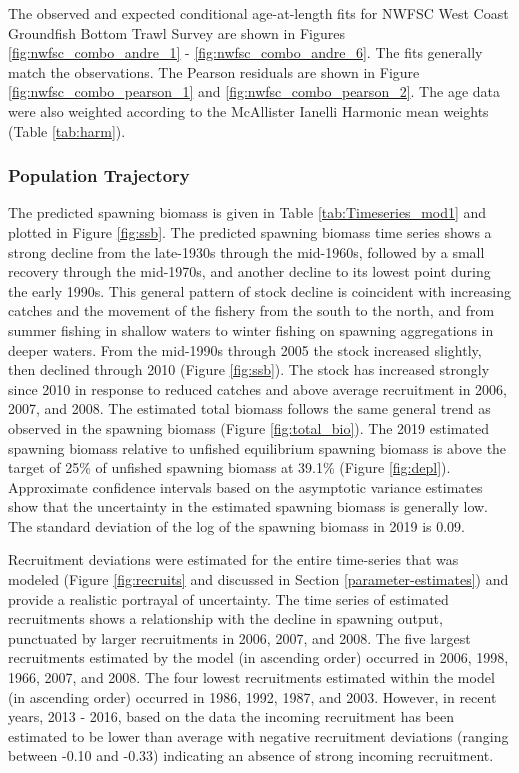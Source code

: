 \documentclass[12pt,]{article}
\begin{document}
The observed and expected conditional age-at-length fits for NWFSC West
Coast Groundfish Bottom Trawl Survey are shown in Figures
\ref{fig:nwfsc_combo_andre_1} - \ref{fig:nwfsc_combo_andre_6}. The fits
generally match the observations. The Pearson residuals are shown in
Figure \ref{fig:nwfsc_combo_pearson_1} and
\ref{fig:nwfsc_combo_pearson_2}. The age data were also weighted
according to the McAllister Ianelli Harmonic mean weights (Table
\ref{tab:harm}).

\subsubsection{Population Trajectory}\label{population-trajectory}

The predicted spawning biomass is given in Table
\ref{tab:Timeseries_mod1} and plotted in Figure \ref{fig:ssb}. The
predicted spawning biomass time series shows a strong decline from the
late-1930s through the mid-1960s, followed by a small recovery through
the mid-1970s, and another decline to its lowest point during the early
1990s. This general pattern of stock decline is coincident with
increasing catches and the movement of the fishery from the south to the
north, and from summer fishing in shallow waters to winter fishing on
spawning aggregations in deeper waters. From the mid-1990s through 2005
the stock increased slightly, then declined through 2010 (Figure
\ref{fig:ssb}). The stock has increased strongly since 2010 in response
to reduced catches and above average recruitment in 2006, 2007, and
2008. The estimated total biomass follows the same general trend as
observed in the spawning biomass (Figure \ref{fig:total_bio}). The 2019
estimated spawning biomass relative to unfished equilibrium spawning
biomass is above the target of 25\% of unfished spawning biomass at
39.1\% (Figure \ref{fig:depl}). Approximate confidence intervals based
on the asymptotic variance estimates show that the uncertainty in the
estimated spawning biomass is generally low. The standard deviation of
the log of the spawning biomass in 2019 is 0.09.

Recruitment deviations were estimated for the entire time-series that
was modeled (Figure \ref{fig:recruits} and discussed in Section
\ref{parameter-estimates}) and provide a realistic portrayal of
uncertainty. The time series of estimated recruitments shows a
relationship with the decline in spawning output, punctuated by larger
recruitments in 2006, 2007, and 2008. The five largest recruitments
estimated by the model (in ascending order) occurred in 2006, 1998,
1966, 2007, and 2008. The four lowest recruitments estimated within the
model (in ascending order) occurred in 1986, 1992, 1987, and 2003.
However, in recent years, 2013 - 2016, based on the data the incoming
recruitment has been estimated to be lower than average with negative
recruitment deviations (ranging between -0.10 and -0.33) indicating an
absence of strong incoming recruitment.
\end{document}
